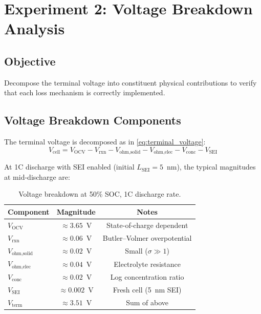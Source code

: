 \section{Experiment 2: Voltage Breakdown Analysis}
\label{sec:exp2}

\subsection{Objective}

Decompose the terminal voltage into constituent physical contributions to verify that each loss mechanism is correctly implemented.

\subsection{Voltage Breakdown Components}

The terminal voltage is decomposed as in \cref{eq:terminal_voltage}:
\begin{equation}
  V_\text{cell} = V_\text{OCV} - V_\text{rxn} - V_\text{ohm,solid} - V_\text{ohm,elec} - V_\text{conc} - V_\text{SEI}
  \label{eq:vbreakdown}
\end{equation}

At 1C discharge with SEI enabled (initial $L_\text{SEI} = 5$~nm), the typical magnitudes at mid-discharge are:

\begin{table}[H]
\centering
\caption{Voltage breakdown at 50\% SOC, 1C discharge rate.}
\label{tab:vbreakdown}
\begin{tabular}{lcc}
\toprule
\textbf{Component} & \textbf{Magnitude} & \textbf{Notes} \\
\midrule
$V_\text{OCV}$ & $\approx 3.65$~V & State-of-charge dependent \\
$V_\text{rxn}$ & $\approx 0.06$~V & Butler--Volmer overpotential \\
$V_\text{ohm,solid}$ & $\approx 0.02$~V & Small ($\sigma \gg 1$) \\
$V_\text{ohm,elec}$ & $\approx 0.04$~V & Electrolyte resistance \\
$V_\text{conc}$ & $\approx 0.02$~V & Log concentration ratio \\
$V_\text{SEI}$ & $\approx 0.002$~V & Fresh cell (5~nm SEI) \\
$V_\text{term}$ & $\approx 3.51$~V & Sum of above \\
\bottomrule
\end{tabular}
\end{table}

